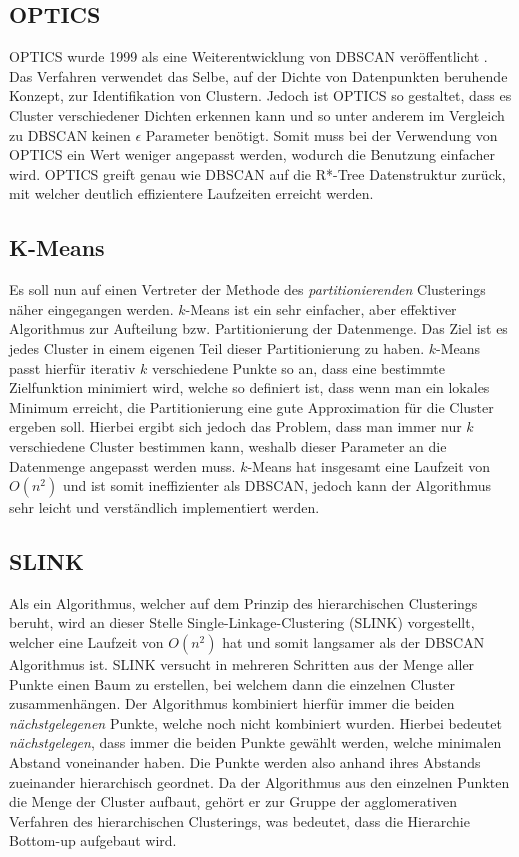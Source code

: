 \documentclass{lni}
\begin{document}
\subsection{OPTICS}
OPTICS wurde 1999 als eine Weiterentwicklung von DBSCAN veröffentlicht \cite{OPTICS}. Das Verfahren verwendet das Selbe, auf der Dichte von Datenpunkten beruhende Konzept, zur Identifikation von Clustern. Jedoch ist OPTICS so gestaltet, dass es Cluster verschiedener Dichten erkennen kann und so unter anderem im Vergleich zu DBSCAN keinen $\epsilon$ Parameter benötigt.  Somit muss bei der Verwendung von OPTICS ein Wert weniger angepasst werden, wodurch die Benutzung einfacher wird. OPTICS greift genau wie DBSCAN auf die R*-Tree Datenstruktur zurück, mit welcher deutlich effizientere Laufzeiten erreicht werden.


\subsection{K-Means}
Es soll nun auf einen Vertreter der Methode des \textit{partitionierenden} Clusterings näher eingegangen werden. $k$-Means \cite{TOP10} ist ein sehr einfacher, aber effektiver Algorithmus zur Aufteilung bzw. Partitionierung der Datenmenge. Das Ziel ist es jedes Cluster in einem eigenen Teil dieser Partitionierung zu haben. $k$-Means passt hierfür iterativ $k$ verschiedene Punkte so an, dass eine bestimmte Zielfunktion minimiert wird, welche so definiert ist, dass wenn man ein lokales Minimum erreicht, die Partitionierung eine gute Approximation für die Cluster ergeben soll. Hierbei ergibt sich jedoch das Problem, dass man immer nur $k$ verschiedene Cluster bestimmen kann, weshalb dieser Parameter an die Datenmenge angepasst werden muss. $k$-Means hat insgesamt eine Laufzeit von $O(n^2)$ und ist somit ineffizienter als DBSCAN, jedoch kann der Algorithmus sehr leicht und verständlich implementiert werden.


\subsection{SLINK}
Als ein Algorithmus, welcher auf dem Prinzip des hierarchischen Clusterings beruht, wird an dieser Stelle Single-Linkage-Clustering (SLINK) \cite{HIER} vorgestellt, welcher eine Laufzeit von $O(n^2)$ hat und somit langsamer als der DBSCAN Algorithmus ist. SLINK versucht in mehreren Schritten aus der Menge aller Punkte einen Baum zu erstellen, bei welchem dann die einzelnen Cluster zusammenhängen. Der Algorithmus kombiniert hierfür immer die beiden \textit{nächstgelegenen} Punkte, welche noch nicht kombiniert wurden. Hierbei bedeutet \textit{nächstgelegen}, dass immer die beiden Punkte gewählt werden, welche minimalen Abstand voneinander haben. Die Punkte werden also anhand ihres Abstands zueinander hierarchisch geordnet. Da der Algorithmus aus den einzelnen Punkten die Menge der Cluster aufbaut, gehört er zur Gruppe der agglomerativen Verfahren des hierarchischen Clusterings, was bedeutet, dass die Hierarchie \glqq Bottom-up\grqq{} aufgebaut wird.
\end{document}
